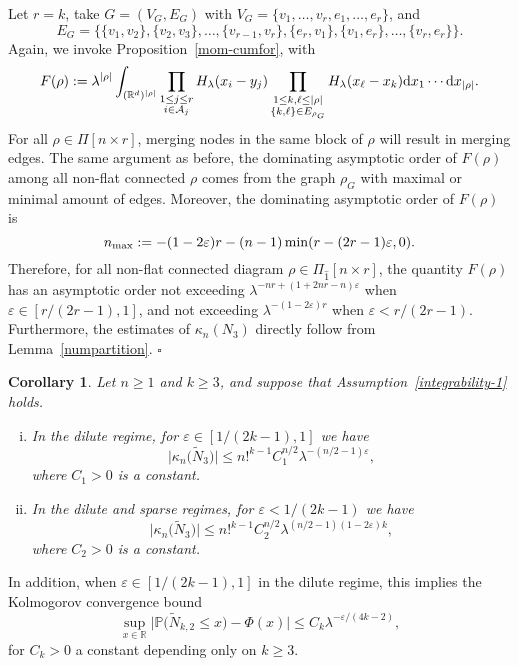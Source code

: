 \documentclass[12pt]{article}
\newcommand{\R}{\mathbb{R}}
\newcommand{\IP}{\mathbb{P}}
\newtheorem{corollary}[prop]{Corollary}
\newenvironment{Proof}{\removelastskip\par\medskip
\noindent{\em Proof.} \rm}{\penalty-20\null\hfill$\square$\par\medbreak}
\numberwithin{equation}{section}
\begin{document}
\begin{Proof}
Let $r=k$, take $G=(V_G,E_G)$ with $V_G=\{v_1,\ldots,v_r,e_1,\ldots,e_r\}$, and 
$$E_G=\{\{v_1,v_2\},\{v_2,v_3\}, \ldots ,\{v_{r-1},v_r\},\{e_r,v_1\},\{v_1,e_r\}, \ldots ,\{v_r,e_r\}\}.
$$
 Again, we invoke Proposition~\ref{mom-cumfor}, with 
\begin{equation}
\nonumber
F(\rho):=\lambda^{|\rho|}\int_{(\R^d)^{|\rho|}}\prod_{\substack{
    1 \leq j \leq r
    \\
    i\in {\cal A}_j}}
H_{\lambda}(x_i-y_j)
\prod_{\substack{1\leq k , \ell \le|\rho|\\\{ k , \ell \}\in E_{\rho_G}}}H_{\lambda}(x_\ell-x_k)\mathrm{d}x_1\cdots\mathrm{d}x_{|\rho|}.
\end{equation}
For all $\rho\in\Pi[n\times r]$, merging nodes in the same block of $\rho$ will result in merging edges. The same argument as before, the dominating asymptotic order of $F(\rho)$ among all non-flat connected $\rho$ comes from the graph $\rho_G$ with maximal or minimal amount of edges. Moreover,  the dominating asymptotic order of $F(\rho)$ is 
$$
n_{{\rm max}} := - (1 - 2 \varepsilon ) r-(n-1)\min (
 r 
 - (2r-1)\varepsilon 
, 0).
$$
Therefore, for all non-flat connected diagram $\rho\in\Pi_{\widehat{1}}[n\times r]$, the quantity $F(\rho)$ has an asymptotic order not exceeding $\lambda^{
  - nr 
  +( 1 + 2nr-n ) \varepsilon 
}$ when $\varepsilon \in [ r / ( 2r-1) ,1]$, and not exceeding $\lambda^{
  -( 1 - 2 \varepsilon )r
}$ when $\varepsilon < r / ( 2r-1)$.
Furthermore, the estimates of $\kappa_n(N_3)$ directly follow
from Lemma~\ref{numpartition}.
\end{Proof}

\begin{corollary}
  Let $n\geq 1$ and $k\geq 3$,
  and suppose that Assumption~\eqref{integrability-1} holds. 
  \begin{enumerate}[i)]
  \item In the dilute regime, for $\varepsilon \in [1/(2k-1),1]$
    we have 
$$
    \big|
    \kappa_n\big(\widetilde{N}_3\big)
    \big|
    \leq n!^{k-1} C_1^{n/2} \lambda^{-(n/2-1)\varepsilon },
    $$
    where $C_1>0$ is a constant.
\item In the dilute and sparse regimes, for 
 $\varepsilon < 1 / (2k-1)$ we have 
    $$
  \big|
  \kappa_n\big(\widetilde{N}_3\big)
  \big|
  \leq n!^{k-1}
  C_2^{n/2} \lambda^{ (n/2-1 ) (1 - 2 \varepsilon )k},
      $$
      where $C_2>0$ is a constant.
      \end{enumerate} 
\end{corollary}
  In addition, when $\varepsilon \in [ 1/(2k-1) , 1 ]$
  in the dilute regime, this implies 
  the Kolmogorov convergence bound 
\begin{equation}
\nonumber
\sup_{x\in\R}\big|\IP \big(\widetilde{N}_{k,2}\leq x\big)-\Phi(x)\big|\leq C_k \lambda^{
  - \varepsilon / ( 4k-2 ) },
\end{equation}
for $C_k>0$ a constant depending only on $k \geq 3$. 
\end{document}
